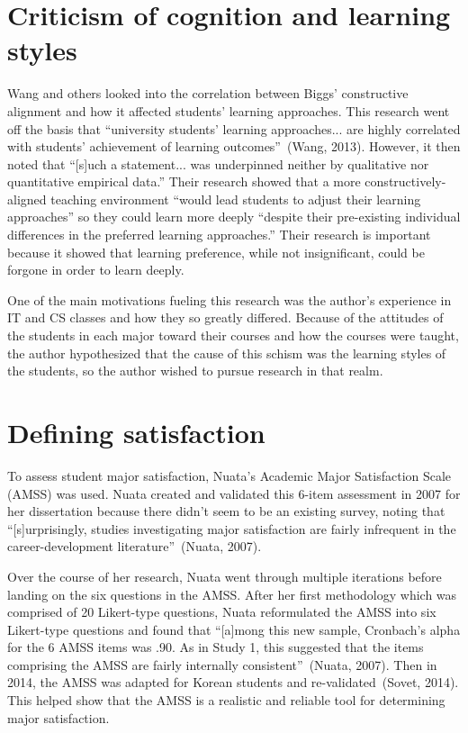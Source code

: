\section{Criticism of cognition and learning styles}
Wang and others looked into the correlation between Biggs' constructive alignment and how it affected students' learning approaches. This research went off the basis that ``university students' learning approaches... are highly correlated with students' achievement of learning outcomes''~(Wang, 2013). However, it then noted that ``[s]uch a statement... was underpinned neither by qualitative nor quantitative empirical data.'' Their research showed that a more constructively-aligned teaching environment ``would lead students to adjust their learning approaches'' so they could learn more deeply ``despite their pre-existing individual differences in the preferred learning approaches.'' Their research is important because it showed that learning preference, while not insignificant, could be forgone in order to learn deeply.

One of the main motivations fueling this research was the author's experience in IT and CS classes and how they so greatly differed. Because of the attitudes of the students in each major toward their courses and how the courses were taught, the author hypothesized that the cause of this schism was the learning styles of the students, so the author wished to pursue research in that realm.

\section{Defining satisfaction}
To assess student major satisfaction, Nuata's Academic Major Satisfaction Scale (AMSS) was used. Nuata created and validated this 6-item assessment in 2007 for her dissertation because there didn't seem to be an existing survey, noting that ``[s]urprisingly, studies investigating major satisfaction are fairly infrequent in the career-development literature''~(Nuata, 2007).

Over the course of her research, Nuata went through multiple iterations before landing on the six questions in the AMSS. After her first methodology which was comprised of 20 Likert-type questions, Nuata reformulated the AMSS into six Likert-type questions and found that ``[a]mong this new sample, Cronbach's alpha for the 6 AMSS items was .90. As in Study 1, this suggested that the items comprising the AMSS are fairly internally consistent''~(Nuata, 2007). Then in 2014, the AMSS was adapted for Korean students and re-validated~(Sovet, 2014). This helped show that the AMSS is a realistic and reliable tool for determining major satisfaction.

